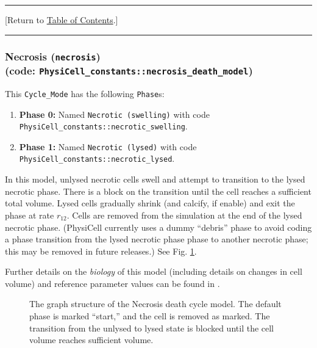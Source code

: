 \documentclass[12pt]{article}
\renewcommand{\v}{\verb}
\newcommand{\TOClink}{\begin{center}\hrule\vskip-5pt\phantom{.}\hfill[Return to \hyperlink{TOC}{Table of Contents}.]\hfill\phantom{.}\vskip3pt\hrule\end{center}}
\begin{document}
\TOClink 


\subsubsection{Necrosis (\texttt{necrosis})\\
(code: \texttt{PhysiCell\_constants::necrosis\_death\_model})}
\label{sec:Standard_Models:Necrosis}
This \v|Cycle_Mode| has the following \v|Phase|s: 
\begin{enumerate}
\item 
\textbf{Phase 0:} Named \v|Necrotic (swelling)| with code \v|PhysiCell_constants::necrotic_swelling|. 
\item
\textbf{Phase 1:} Named \v|Necrotic (lysed)| with code \v|PhysiCell_constants::necrotic_lysed|. 
\end{enumerate}
In this model, unlysed necrotic cells swell and attempt to 
transition to the lysed necrotic  phase. There is a block on the 
transition until the cell reaches a sufficient 
total volume. Lysed cells gradually shrink (and calcify, if 
enable) and exit the phase at 
rate $r_{12}$. Cells are removed 
from the simulation at the end of the lysed necrotic phase. 
(PhysiCell currently uses a dummy ``debris'' phase to avoid coding a 
phase transition from the lysed necrotic phase phase to another necrotic phase; 
this may be removed in future releases.) 
See Fig. \ref{fig:death_model:necrosis}. 

Further details on the \emph{biology} of this model (including 
details on changes in cell volume) and reference parameter values can be found in \cite{ref:PhysiCell}. 


\begin{figure}
\begin{mdframed}[style=mystyle]
\caption{The graph structure of the Necrosis death cycle model. The default phase is marked 
``start,'' and the cell is removed as marked. The transition from the 
unlysed to lysed state is blocked until the cell volume reaches sufficient volume.}
\label{fig:death_model:necrosis}
\end{mdframed}
\end{figure}
\end{document}
